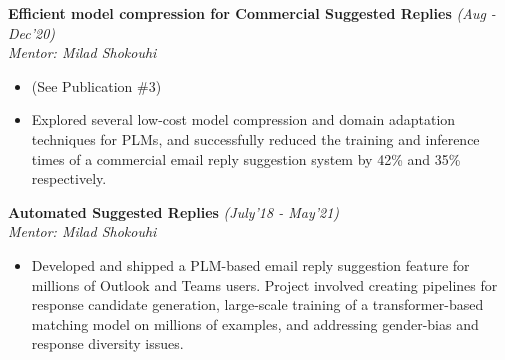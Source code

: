 \textsf{\textbf{Efficient model compression for Commercial Suggested Replies}} \hfill\textit{\small(Aug - Dec'20)}
\\ {\textit{Mentor: Milad Shokouhi}}
\normalsize
\begin{itemize}[leftmargin=*]\compresslist
\item[] (See Publication \#3)\vspace{-1mm}
\item[] Explored several low-cost model compression and domain adaptation techniques for PLMs, and successfully reduced the training and inference times of a commercial email reply suggestion system by 42\% and 35\% respectively.
\end{itemize}

\textsf{\textbf{Automated Suggested Replies}} \hfill\textit{\small(July'18 - May'21)}
\\ {\textit{Mentor: Milad Shokouhi}} \hfill{ }
\normalsize
\begin{itemize}[leftmargin=*]\compresslist
\item[] Developed and shipped a PLM-based email reply suggestion feature for millions of Outlook and Teams users. Project involved creating pipelines for response candidate generation, large-scale training of a transformer-based matching model on millions of examples, and addressing gender-bias and response diversity issues.
\end{itemize}